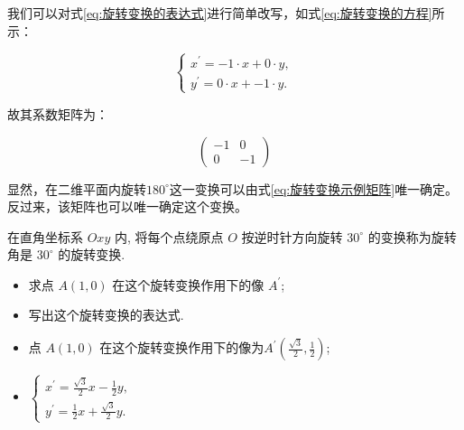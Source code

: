 \documentclass[lang=cn,newtx,10pt,scheme=chinese]{elegantbook}
\begin{document}
我们可以对式\ref{eq:旋转变换的表达式}进行简单改写，如式\ref{eq:旋转变换的方程}所示：

\begin{equation}
\left\{\begin{array}{l}
x^{\prime}=-1 \cdot x + 0\cdot y, \\
y^{\prime}= 0\cdot x + -1 \cdot y .
\end{array}\right.
\label{eq:旋转变换的方程}
\end{equation}

故其系数矩阵为：

\begin{equation}
\left(\begin{array}{rr}
-1  & 0 \\
0  & -1
\end{array}\right)
\label{eq:旋转变换示例矩阵}
\end{equation}

显然，在二维平面内旋转$180^{\circ}$这一变换可以由式\ref{eq:旋转变换示例矩阵}唯一确定。反过来，该矩阵也可以唯一确定这个变换。

\begin{exercise}
 
在直角坐标系 $O x y$ 内, 将每个点绕原点 $O$ 按逆时针方向旋转 $30^{\circ}$ 的变换称为旋转角是 $30^{\circ}$ 的旋转变换.

\vspace{0.5cm}

\begin{itemize}
    \item 求点 $A(1,0)$ 在这个旋转变换作用下的像 $A^{\prime}$;
    \item 写出这个旋转变换的表达式.
\end{itemize}
\end{exercise}

\begin{solution}
\begin{itemize}
    \item 点 $A(1,0)$ 在这个旋转变换作用下的像为$A^{\prime}\left(\frac{\sqrt{3}}{2}, \frac{1}{2}\right)$;
    \item $\left\{\begin{array}{l}x^{\prime}=\frac{\sqrt{3}}{2} x-\frac{1}{2} y, \\ y^{\prime}=\frac{1}{2} x+\frac{\sqrt{3}}{2} y .\end{array}\right.$
\end{itemize}
\end{solution}

\vspace{0.5cm}
\end{document}

